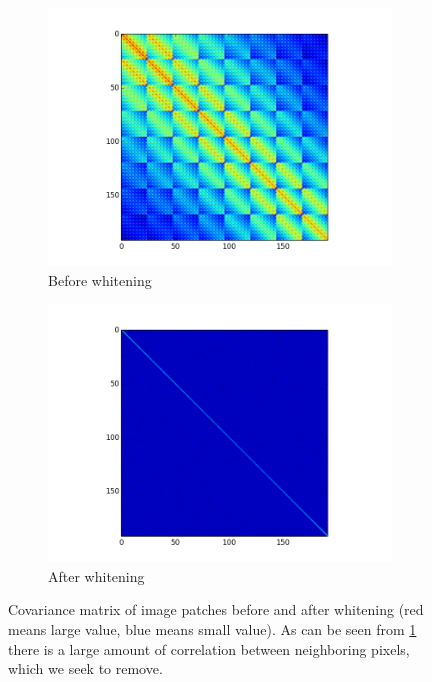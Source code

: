 \documentclass{article} %
\begin{document}
\begin{figure}
  \centering
  \begin{subfigure}[h]{0.45\columnwidth}
    \includegraphics[width=\columnwidth]{./images/before_whiten.png}
    \caption{Before whitening}
    \label{figBefore}
  \end{subfigure}
  \hspace{0.04\columnwidth}
  \centering
  \begin{subfigure}[h]{0.45\columnwidth}
    \includegraphics[width=\columnwidth]{./images/after_whiten.png}
    \caption{After whitening}
    \label{figAfter}
  \end{subfigure}
  \caption{Covariance matrix of image patches before and after whitening (red means large value, blue means small value). As can be seen from \ref{figBefore} there is a large amount of correlation between neighboring pixels, which we seek to remove.}
  \label{whitening}
\end{figure}
\end{document}
